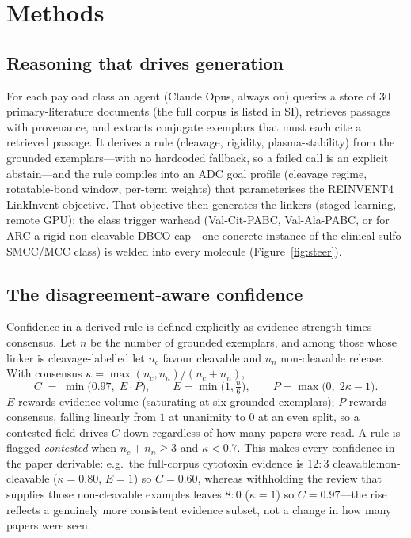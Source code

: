 \documentclass[10pt]{article}
\begin{document}
\section{Methods}\subsection{Reasoning that drives generation}
For each payload class an agent (Claude Opus, always on) queries a store of 30 primary-literature documents (the full corpus is listed in SI), retrieves passages with provenance, and extracts conjugate exemplars that must each cite a retrieved passage. It derives a rule (cleavage, rigidity, plasma-stability) from the grounded exemplars---with no hardcoded fallback, so a failed call is an explicit abstain---and the rule compiles into an ADC goal profile (cleavage regime, rotatable-bond window, per-term weights) that parameterises the REINVENT4 LinkInvent objective. That objective then generates the linkers (staged learning, remote GPU); the class trigger warhead (Val-Cit-PABC, Val-Ala-PABC, or for ARC a rigid non-cleavable DBCO cap---one concrete instance of the clinical sulfo-SMCC/MCC class) is welded into every molecule (Figure~\ref{fig:steer}).

\subsection{The disagreement-aware confidence}
Confidence in a derived rule is defined explicitly as evidence strength times consensus. Let $n$ be the number of grounded exemplars, and among those whose linker is cleavage-labelled let $n_c$ favour cleavable and $n_n$ non-cleavable release. With consensus $\kappa = \max(n_c,n_n)/(n_c+n_n)$,
\begin{equation}
C \;=\; \min\!\big(0.97,\; E\cdot P\big),\qquad E=\min\!\big(1,\tfrac{n}{6}\big),\qquad P=\max\!\big(0,\;2\kappa-1\big).
\end{equation}
$E$ rewards evidence volume (saturating at six grounded exemplars); $P$ rewards consensus, falling linearly from $1$ at unanimity to $0$ at an even split, so a contested field drives $C$ down regardless of how many papers were read. A rule is flagged \emph{contested} when $n_c+n_n\ge 3$ and $\kappa<0.7$. This makes every confidence in the paper derivable: e.g.\ the full-corpus cytotoxin evidence is $12{:}3$ cleavable:non-cleavable ($\kappa=0.80$, $E=1$) so $C=0.60$, whereas withholding the review that supplies those non-cleavable examples leaves $8{:}0$ ($\kappa=1$) so $C=0.97$---the rise reflects a genuinely more consistent evidence subset, not a change in how many papers were seen.
\end{document}
